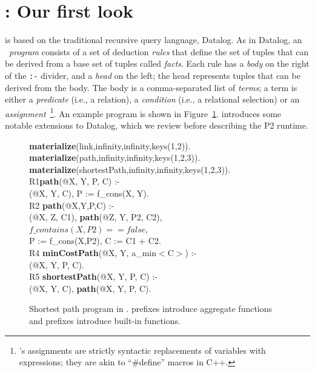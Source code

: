 \section{\OVERLOG: Our first look}
\label{ch:p2:sec:overlog}

\OVERLOG is based on the traditional recursive query language, Datalog.  As in
Datalog, an \OVERLOG~{\em program} consists of a set of deduction {\em rules}
that define the set of tuples that can be derived from a base set of tuples
called {\em facts}.  Each rule has a {\em body} on the right of the \texttt{:-}
divider, and a {\em head} on the left; the head represents tuples that can be
derived from the body.  The body is a comma-separated list of {\em terms}; a
term is either a {\em predicate} (i.e., a relation), a {\em condition} (i.e., a
relational selection) or an {\em assignment}~\footnote{\OVERLOG's assignments
are strictly syntactic replacements of variables with expressions; they are
akin to ``\#define'' macros in C++.}.  An example \OVERLOG program is shown in
Figure~\ref{ch:p2:fig:overlogSP}.  \OVERLOG introduces some notable extensions
to Datalog, which we review before describing the P2 runtime.

\begin{figure}
\ssp
\begin{boxedminipage}{\linewidth}
{\bf materialize}(link,infinity,infinity,keys(1,2)). \\
{\bf materialize}(path,infinity,infinity,keys(1,2,3)).  \\
{\bf materialize}(shortestPath,infinity,infinity,keys(1,2,3)). \\

R1{\bf path}(@X, Y, P, C) :- \\
(@X, Y, C), P := f\_cons(X, Y). \\

R2 {\bf path}(@X,Y,P,C) :- \\
(@X, Z, C1), {\bf path}(@Z, Y, P2, C2), \\
\datalogspace $f\_contains(X,P2) == false$, \\
\datalogspace P := f\_cons(X,P2), C := C1 + C2. \\ 

R4 {\bf minCostPath}(@X, Y, a\_min$<$C$>$) :-  \\
(@X, Y, P, C). \\

R5 {\bf shortestPath}(@X, Y, P, C) :- \\
(@X, Y, C), {\bf path}(@X, Y, P, C).\\
\end{boxedminipage}
\caption{\label{ch:p2:fig:overlogSP}Shortest path program in \OVERLOG. 
prefixes introduce aggregate functions and  prefixes introduce
built-in functions.}
\end{figure}

